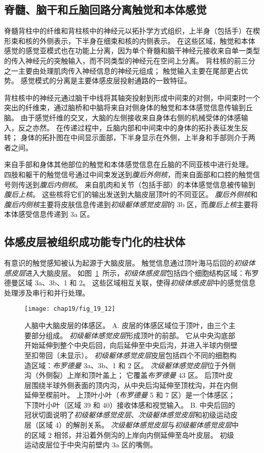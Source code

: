 \subsection{脊髓、脑干和丘脑回路分离触觉和本体感觉}

脊髓背柱中的纤维和背柱核中的神经元以拓扑学方式组织，上半身（包括手）在楔形束和核的外侧表示，下半身在细束和核的内侧表示。
在这些区域，触觉和本体感觉的感觉亚模式也在功能上分离，因为单个脊髓和脑干神经元接收来自单一类型的传入神经元的突触输入，而不同类型的神经元在空间上分离。 
背柱核的前三分之一主要由处理肌肉传入神经信息的神经元组成； 触觉输入主要在尾部更占优势。
感觉模式的分离是主要体感皮层投射通路的一致特征。


背柱核中的神经元通过脑干中线将其轴突投射到形成中间束的对侧，中间束时一个突出的纤维束，通过脑桥和中脑将来自对侧身体的触觉和本体感觉信息传输到丘脑。
由于感觉纤维的交叉，大脑的左侧接收来自身体右侧的机械受体的体感输入，反之亦然。
在传递过程中，丘脑内部和中间束中的身体的拓扑表征发生反转；
身体的拓扑图在中间显示面部，下半身显示在外侧，上半身和手部则介于两者之间。


来自手部和身体其他部位的触觉和本体感觉信息在丘脑的不同亚核中进行处理。
四肢和躯干的触觉信号通过中间束发送到\textit{腹后外侧核}，而来自面部和口腔的触觉信号则传送到\textit{腹后内侧核}。
来自肌肉和关节（包括手部）的本体感觉信息被传输到\textit{腹后上核}。
这些核将它们的输出发送到大脑皮层顶叶的不同亚区。 
\textit{腹后外侧核}和\textit{腹后内侧核}主要将皮肤信息传递到\textit{初级躯体感觉皮层}的 3b 区，而\textit{腹后上核}主要将本体感受信息传递到 3a 区。



\subsection{体感皮层被组织成功能专门化的柱状体}

有意识的触觉感知被认为起源于大脑皮层。
触觉信息通过顶叶海马后回的\textit{初级体感皮层}进入大脑皮层。
如图~\ref{fig:19_12}~所示，\textit{初级体感皮层}包括四个细胞结构区域：布罗德曼区域 3a、3b、1 和 2。
这些区域相互关联，使得\textit{初级体感皮层}中的感觉信息处理涉及串行和并行处理。


\begin{figure}[htbp]
	\centering
	\texttt{[image: chap19/fig\_19\_12]}
	\caption{人脑中大脑皮层的体感区。
		A. 皮层的体感区域位于顶叶，由三个主要部分组成。
		\textit{初级躯体感觉皮层}形成顶叶的前部。
		它从中央沟底部开始延伸到整个中央后回，向后延伸至中央后沟，并进入半球内侧壁至扣带回（未显示）。
		\textit{初级躯体感觉皮层}皮层包括四个不同的细胞构造区域：\textit{布罗德曼} 3a、3b、1 和 2 区。
		\textit{次级躯体感觉皮层}位于外侧沟（外侧裂）上岸和顶叶盖上；
		它覆盖\textit{布罗德曼} 43 区。
		后顶叶皮层围绕半球外侧表面的顶内沟，从中央后沟延伸至顶枕沟，并在内侧延伸至楔前叶。
		上顶叶小叶（\textit{布罗德曼}  5 和 7 区）是一个体感区；
		下顶叶小叶（区域 39 和 40）接收体感和视觉输入。
		B. 中央后回的冠状切面说明了\textit{初级躯体感觉皮层}、\textit{次级躯体感觉皮层}和初级运动皮层（区域 4）的解剖关系。
		\textit{次级躯体感觉皮层}与\textit{初级躯体感觉皮层}中的区域 2 相邻，并沿着外侧沟的上岸向内侧延伸至岛叶皮层。
		初级运动皮层位于中央沟前壁内 3a 区的嘴侧。}
	\label{fig:19_12}
\end{figure}


